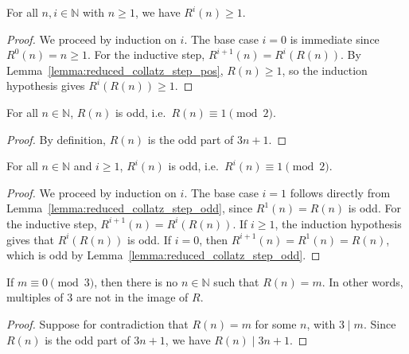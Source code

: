 \begin{lemma}\label{lemma:R_pos}\leanok{}
For all $n, i \in \mathbb{N}$ with $n \geq 1$, we have $R^i(n) \geq 1$.
\end{lemma}
\begin{proof}\leanok
We proceed by induction on $i$. The base case $i = 0$ is immediate since $R^0(n) = n \geq 1$. For the inductive step, $R^{i+1}(n) = R^i(R(n))$. By Lemma~\ref{lemma:reduced_collatz_step_pos}, $R(n) \geq 1$, so the induction hypothesis gives $R^i(R(n)) \geq 1$.
\end{proof}

\begin{lemma}\label{lemma:reduced_collatz_step_odd}\leanok
For all $n \in \mathbb{N}$, $R(n)$ is odd, i.e.\ $R(n) \equiv 1 \pmod{2}$.
\end{lemma}
\begin{proof}\leanok
By definition, $R(n)$ is the odd part of $3n+1$.
\end{proof}

\begin{lemma}\label{lemma:R_odd}\leanok{}
For all $n \in \mathbb{N}$ and $i \geq 1$, $R^i(n)$ is odd, i.e.\ $R^i(n) \equiv 1 \pmod{2}$.
\end{lemma}
\begin{proof}\leanok
We proceed by induction on $i$. The base case $i = 1$ follows directly from Lemma~\ref{lemma:reduced_collatz_step_odd}, since $R^1(n) = R(n)$ is odd. For the inductive step, $R^{i+1}(n) = R^i(R(n))$. If $i \geq 1$, the induction hypothesis gives that $R^i(R(n))$ is odd. If $i = 0$, then $R^{i+1}(n) = R^1(n) = R(n)$, which is odd by Lemma~\ref{lemma:reduced_collatz_step_odd}.
\end{proof}

\begin{lemma}\label{lemma:not_exists_R_with_m_div3}\leanok
If $m \equiv 0 \pmod{3}$, then there is no $n \in \mathbb{N}$ such that $R(n) = m$. In other words, multiples of $3$ are not in the image of $R$.
\end{lemma}
\begin{proof}\leanok
Suppose for contradiction that $R(n) = m$ for some $n$, with $3 \mid m$. Since $R(n)$ is the odd
part of $3n+1$, we have $R(n) \mid 3n+1$.
\end{proof}

